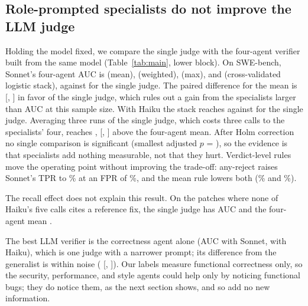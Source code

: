 \subsection{Role-prompted specialists do not improve the LLM judge}

Holding the model fixed, we compare the single judge with the four-agent verifier built from the same model (Table~\ref{tab:main}, lower block). On SWE-bench, Sonnet's four-agent AUC is \nSweSonnetMeanAuc{} (mean), \nSweSonnetWeightedAuc{} (weighted), \nSweSonnetMaxAuc{} (max), and \nSonnetStackAuc{} (cross-validated logistic stack), against \nSonnetSingleAucExact{} for the single judge. The paired difference for the mean is \nSweDiffSonnetSingleJudgeVsSonnetAgentsMean{} [\nSweDiffSonnetSingleJudgeVsSonnetAgentsMeanLo, \nSweDiffSonnetSingleJudgeVsSonnetAgentsMeanHi] in favor of the single judge, which rules out a gain from the specialists larger than \nSweDiffSonnetSingleJudgeVsSonnetAgentsMeanLoAbs{} AUC at this sample size. With Haiku the stack reaches \nHaikuStackAuc{} against \nHaikuSingleAucExact{} for the single judge. Averaging three runs of the single judge, which costs three calls to the specialists' four, reaches \nSweSonnetThreeAuc, \nSweDiffSonnetSingleJudgeMeanOfRunsVsSonnetAgentsMean{} [\nSweDiffSonnetSingleJudgeMeanOfRunsVsSonnetAgentsMeanLo, \nSweDiffSonnetSingleJudgeMeanOfRunsVsSonnetAgentsMeanHi] above the four-agent mean. After Holm correction no single comparison is significant (smallest adjusted $p$ = \nHolmMinP), so the evidence is that specialists add nothing measurable, not that they hurt. Verdict-level rules move the operating point without improving the trade-off: any-reject raises Sonnet's TPR to \nSweSonnetAnyRejectTpr\% at an FPR of \nSweSonnetAnyRejectFpr\%, and the mean rule lowers both (\nSweSonnetMeanTpr\% and \nSweSonnetMeanFpr\%).

The recall effect does not explain this result. On the \nHaikuCleanAllN{} patches where none of Haiku's five calls cites a reference fix, the single judge has AUC \nHaikuCleanAllSingleAuc{} and the four-agent mean \nHaikuCleanAllMeanAuc.

The best LLM verifier is the correctness agent alone (AUC \nSweSonnetCorrAuc{} with Sonnet, \nSweHaikuCorrAuc{} with Haiku), which is one judge with a narrower prompt; its difference from the generalist is within noise (\nSweDiffSonnetSingleJudgeVsSonnetCorrectnessAgent{} [\nSweDiffSonnetSingleJudgeVsSonnetCorrectnessAgentLo, \nSweDiffSonnetSingleJudgeVsSonnetCorrectnessAgentHi]). Our labels measure functional correctness only, so the security, performance, and style agents could help only by noticing functional bugs; they do notice them, as the next section shows, and so add no new information.

